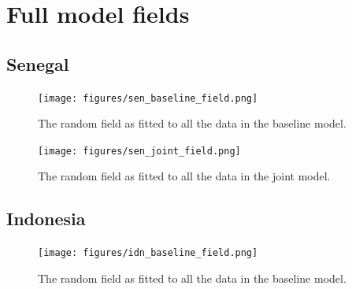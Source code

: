 \documentclass[10pt,a4]{article}
\begin{document}
\clearpage

\section{Full model fields}


\subsection{Senegal}




\begin{figure}[h!]
\centering

\texttt{[image: figures/sen\_baseline\_field.png]}

\caption{The random field as fitted to all the data in the baseline model.}
\label{baselinefieldsen}
\end{figure}


\begin{figure}[h!]
     \centering
     \label{gpsencov}
\end{figure}


\begin{figure}[h!]
\centering

\texttt{[image: figures/sen\_joint\_field.png]}

\caption{The random field as fitted to all the data in the joint model.}
\label{jointfieldsen}
\end{figure}




\clearpage
\subsection{Indonesia}




\begin{figure}[h!]
\centering

\texttt{[image: figures/idn\_baseline\_field.png]}

\caption{The random field as fitted to all the data in the baseline model.}
\label{baselinefieldidn}
\end{figure}



\begin{figure}[h!]
     \centering
     \label{gpsencov}
\end{figure}
\end{document}
